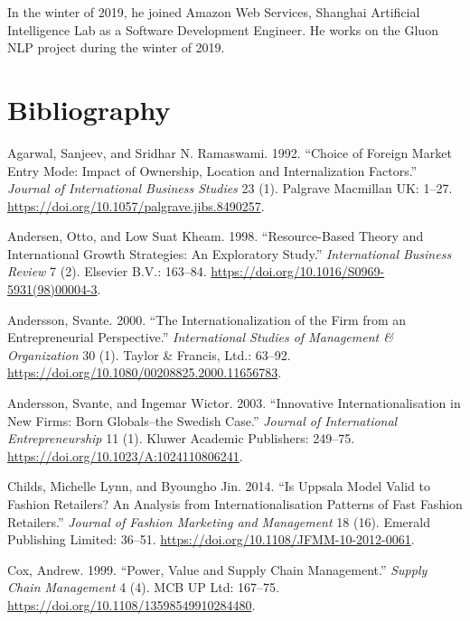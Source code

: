 \documentclass[12pt,a4paper]{article}
\begin{document}
In the winter of 2019, he joined Amazon Web Services, Shanghai
Artificial Intelligence Lab as a Software Development Engineer. He works
on the Gluon NLP project during the winter of 2019. \pagebreak

\hypertarget{bibliography}{%
\section*{Bibliography}\label{bibliography}}

\hypertarget{refs}{}
\leavevmode\hypertarget{ref-innovative4}{}%
Agarwal, Sanjeev, and Sridhar N. Ramaswami. 1992. ``Choice of Foreign
Market Entry Mode: Impact of Ownership, Location and Internalization
Factors.'' \emph{Journal of International Business Studies} 23 (1).
Palgrave Macmillan UK: 1--27.
\url{https://doi.org/10.1057/palgrave.jibs.8490257}.

\leavevmode\hypertarget{ref-innovative5}{}%
Andersen, Otto, and Low Suat Kheam. 1998. ``Resource-Based Theory and
International Growth Strategies: An Exploratory Study.''
\emph{International Business Review} 7 (2). Elsevier B.V.: 163--84.
\url{https://doi.org/10.1016/S0969-5931(98)00004-3}.

\leavevmode\hypertarget{ref-innovative1}{}%
Andersson, Svante. 2000. ``The Internationalization of the Firm from an
Entrepreneurial Perspective.'' \emph{International Studies of Management
\& Organization} 30 (1). Taylor \& Francis, Ltd.: 63--92.
\url{https://doi.org/10.1080/00208825.2000.11656783}.

\leavevmode\hypertarget{ref-innovativeInternationalisation}{}%
Andersson, Svante, and Ingemar Wictor. 2003. ``Innovative
Internationalisation in New Firms: Born Globals--the Swedish Case.''
\emph{Journal of International Entrepreneurship} 11 (1). Kluwer Academic
Publishers: 249--75. \url{https://doi.org/10.1023/A:1024110806241}.

\leavevmode\hypertarget{ref-innovative7}{}%
Childs, Michelle Lynn, and Byoungho Jin. 2014. ``Is Uppsala Model Valid
to Fashion Retailers? An Analysis from Internationalisation Patterns of
Fast Fashion Retailers.'' \emph{Journal of Fashion Marketing and
Management} 18 (16). Emerald Publishing Limited: 36--51.
\url{https://doi.org/10.1108/JFMM-10-2012-0061}.

\leavevmode\hypertarget{ref-innovative2}{}%
Cox, Andrew. 1999. ``Power, Value and Supply Chain Management.''
\emph{Supply Chain Management} 4 (4). MCB UP Ltd: 167--75.
\url{https://doi.org/10.1108/13598549910284480}.
\end{document}
